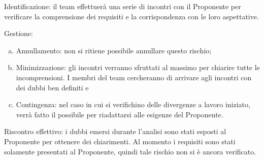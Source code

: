 \documentclass[../PianoProgetto.tex]{subfiles}
\begin{document}
	Identificazione: il team effettuerà una serie di incontri con il Proponente per verificare la comprensione dei requisiti e la corrispondenza con le loro aspettative.
	
	Gestione:
	\begin{enumerate}[(a)]
		\item Annullamento: non si ritiene possibile annullare questo rischio;
		\item Minimizzazione: gli incontri verranno sfruttati al massimo per chiarire tutte le incomprensioni. I membri del team cercheranno di arrivare agli incontri con dei dubbi ben definiti e 
		\item Contingenza: nel caso in cui si verifichino delle divergenze a lavoro iniziato, verrà fatto il possibile per riadattarsi alle esigenze del Proponente.
	\end{enumerate}	
	Riscontro effettivo: i dubbi emersi durante l’analisi sono stati esposti al Proponente per ottenere dei chiarimenti. Al momento i requisiti sono stati solamente presentati al Proponente, quindi tale rischio non si è ancora verificato.

			
\end{document}

